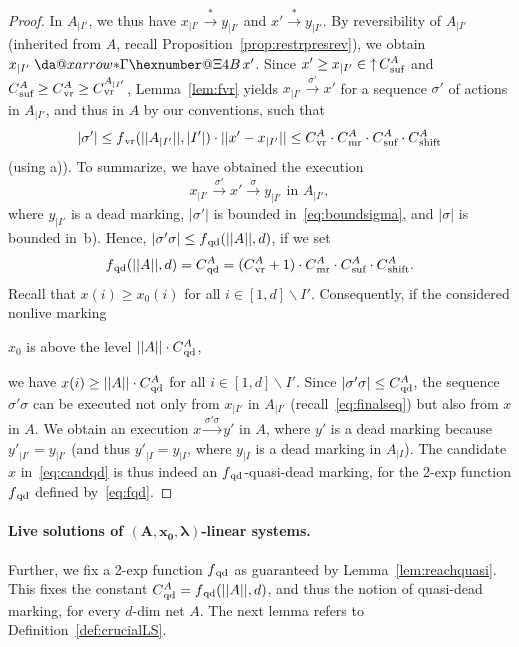 \documentclass[11pt,a4paper]{amsart}
\makeatletter
\newcommand{\step}[1]{\mathrel{\xrightarrow{#1}}}
\newcommand{\reach}{\step{*}}
\newcommand{\virtual}[1]{\mathrel{\xdashrightarrow{#1}}\hspace{-0.3em}}
\newcommand{\vreach}{\virtual{*}}
\newcommand{\nnorm}[1]{||#1||}
\newcommand{\vr}{{}_\textnormal{vr}}
\newcommand{\mr}{{}_\textnormal{mr}}
\newcommand{\upC}[1]{\mathop{\uparrow}#1}
\newcommand{\suf}{{}_\textnormal{suf}}
\newcommand{\shift}{{}_\textnormal{shift}}
\newcommand{\qd}{{}_\textnormal{qd}}
\newcommand{\restr}[1]{_{|{#1}}}
\newcommand*{\da@rightarrow}{\mathchar"0\hexnumber@\symAMSa 4B }
\newcommand*{\xdashrightarrow}[2][]{%
  \mathrel{%
    \mathpalette{\da@xarrow{#1}{#2}{}\da@rightarrow{\,}{}}{}%
  }%
}
\newcommand*{\da@xarrow}[7]{%
  \sbox0{$\ifx#7\scriptstyle\scriptscriptstyle\else\scriptstyle\fi#5#1#6\m@th$}%
  \sbox2{$\ifx#7\scriptstyle\scriptscriptstyle\else\scriptstyle\fi#5#2#6\m@th$}%
  \sbox4{$#7\dabar@\m@th$}%
  \dimen@=\wd0 %
  \ifdim\wd2 >\dimen@
    \dimen@=\wd2 %
  \fi
  \count@=2 %
  \def\da@bars{\dabar@\dabar@}%
  \@whiledim\count@\wd4<\dimen@\do{%
    \advance\count@\@ne
    \expandafter\def\expandafter\da@bars\expandafter{%
      \da@bars
      \dabar@ 
    }%
  }%
  \mathrel{#3}%
  \mathrel{%
    \mathop{\da@bars}\limits
    \ifx\\#1\\%
    \else
      _{\copy0}%
    \fi
    \ifx\\#2\\%
    \else
      ^{\copy2}%
    \fi
  }%
  \mathrel{#4}%
}
\theoremstyle{plain}
\theoremstyle{definition}
\theoremstyle{defC}
\theoremstyle{thmC}
\makeatother
\begin{document}
\begin{proof}
In $A\restr{I'}$, we thus have $x\restr{I'}\reach y\restr{I'}$
and $x'\reach y\restr{I'}$. 
By reversibility of $A\restr{I'}$ (inherited from $A$, recall
Proposition~\ref{prop:restrpresrev}), we obtain 
$x\restr{I'}\vreach x'$. Since $x'\geq x\restr{I'}\in\upC{C\suf^A}$
and $C\suf^A\geq
C\vr^A\geq C\vr^{A\restr{I'}}$,
Lemma~\ref{lem:fvr} yields  
 $x\restr{I'}\step{\sigma'} x'$ for a sequence $\sigma'$ of actions in
 $A\restr{I'}$, and thus in $A$ by our conventions, such that
\begin{equation}\label{eq:boundsigma}
	|\sigma'|\leq f\vr(\nnorm{A\restr{I'}},|I'|)\cdot
\nnorm{x'-x\restr{I'}}\leq C\vr^A\cdot
C\mr^A\cdot C\suf^A\cdot C\shift^A
\end{equation}
(using a)). To summarize, we have obtained the execution 
\begin{equation}\label{eq:finalseq}
	x\restr{I'}\step{\sigma'}x'\step{\sigma}y\restr{I'}\text{ in }A\restr{I'},
\end{equation}
where $y\restr{I'}$ is a dead marking, $|\sigma'|$ is bounded
in~\eqref{eq:boundsigma}, and  $|\sigma|$ is bounded
in~b).
Hence,
 $|\sigma'\sigma|\leq
f\qd(\nnorm{A},d)$, if we set
\begin{equation}\label{eq:fqd}
	f\qd(\nnorm{A},d)=C\qd^A=(C\vr^A+1)\cdot C\mr^A\cdot
C\suf^A\cdot C\shift^A.
\end{equation}
	Recall that $x(i)\geq x_0(i)$ for all $i\in[1,d]\smallsetminus
	I'$. 
	Consequently, if the considered nonlive marking 
\begin{center}	$x_0$ is above the level
	$\nnorm{A}\cdot C\qd^A$,
\end{center}
	we have 
$x(i)\geq\nnorm{A}\cdot C\qd^A$ for all $i\in[1,d]\smallsetminus I'$. 
Since $|\sigma'\sigma|\leq C\qd^A$, the sequence $\sigma'\sigma$ can be
executed not only from $x\restr{I'}$ in $A\restr{I'}$
(recall~\eqref{eq:finalseq}) but
	also from $x$ in $A$. We obtain an execution
	$x\step{\sigma'\sigma}y'$ in $A$, where $y'$ is a dead marking
	because ${y'}\restr{I'}=y\restr{I'}$ (and thus
	${y'}\restr{I}=y\restr{I}$, where $y\restr{I}$ is a dead
	marking in $A\restr{I}$).
The candidate $x$ in~\eqref{eq:candqd} is thus indeed an $f\qd$-quasi-dead marking, for the
2-exp function $f\qd$ defined by~\eqref{eq:fqd}.
\end{proof}	

\paragraph{Live solutions of $\bm{(A,x_0,\lambda)}$-linear systems.}
Further, we fix a 2-exp function $f\qd$ as guaranteed by
Lemma~\ref{lem:reachquasi}.  This fixes the constant
$C\qd^A=f\qd(\nnorm{A},d)$, and thus the notion of quasi-dead marking,
for every $d$-dim net $A$.
The next lemma refers to Definition~\ref{def:crucialLS}.
\end{document}
